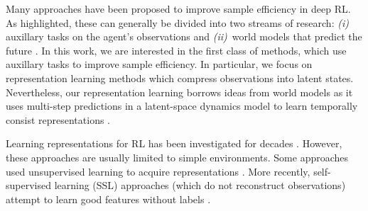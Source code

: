 \documentclass{article}
\makeatletter
\theoremstyle{plain}
\theoremstyle{definition}
\theoremstyle{remark}
\newcommand{\eg}{\textit{e.g.\@}\xspace}
\makeatother
\begin{document}
Many approaches have been proposed to improve sample efficiency in deep RL.
As \citet{laskinCURLContrastiveUnsupervised2020} highlighted, these can generally be divided into two streams of research:
{\em (i)} auxillary tasks on the agent's observations and {\em (ii)}~world models that predict the future
\citep{haRecurrentWorldModels2018,hafnerLearning2019,hansenTemporalDifferenceLearning2022}.
In this work, we are interested in the first class of methods, which use auxillary tasks to improve sample efficiency.
In particular, we focus on representation learning methods which compress observations into latent states.
Nevertheless, our representation learning borrows ideas from world models as it uses multi-step predictions in a
latent-space dynamics model to learn temporally consist representations \citep{zhaoSimplifiedTemporalConsistency2023}.

Learning representations for RL has been investigated for decades
\citep{abelOptimalBehaviorApproximate2016,mannorDynamicAbstractionReinforcement2004,liUnifiedTheoryState2006,andreStateAbstractionProgrammable2002,deardenAbstractionApproximateDecisiontheoretic1997,singhReinforcementLearningSoft1994,higginsDefinitionDisentangledRepresentations2018,vanhoofStableReinforcementLearning2016,watterEmbedControlLocally2015,ghoshRepresentationsStableOffPolicy2020}.
However, these approaches are usually limited to simple environments.
Some approaches used unsupervised learning \citep[\eg VAE,][with reconstruction loss]{kingmaAutoEncoding2014} to acquire representations
\citep{finnDeepSpatialAutoencoders2016,higginsDARLAImprovingZeroShot2017,langeAutonomousReinforcementLearning2012,watterEmbedControlLocally2015}.
More recently, self-supervised learning (SSL) approaches (which do not reconstruct observations)
attempt to learn good features without labels \cite{anandUnsupervisedStateRepresentation2019}.
\end{document}
